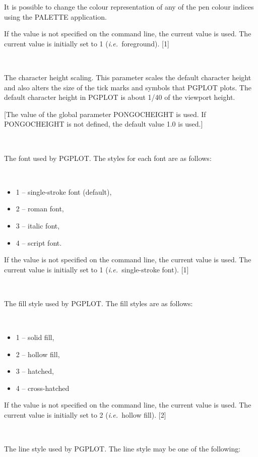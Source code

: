 \documentclass[twoside,11pt]{article}
\renewcommand{\_}{\texttt{\symbol{95}}}
\newcommand{\ie}{{\em i.e.\ }}
\newcommand{\sstsubsection}[1]{ \item[{#1}] \mbox{} \\}
\newcommand{\sstitemlist}[1]{
  \mbox{} \\
  \vspace{-3.5ex}
  \begin{itemize}
     #1
  \end{itemize}
}
\newcommand{\sstitem}{\item}
\newcommand{\sstsubsection}[1]{\item[{#1}]}
\newcommand{\sstitemlist}[1]{
      \begin{itemize}
         #1
      \end{itemize}
      \\
   }
\newcommand{\sstitem}{\item}
\begin{document}
{{{{         }
         It is possible to change the colour representation of any of
         the pen colour indices using the PALETTE application.

         If the value is not specified on the command line, the current
         value is used. The current value is initially set to 1
         (\ie foreground).
         [1]
      }
      \sstsubsection{
         CHEIGHT = \_REAL (Read and Write)
      }{
         The character height scaling. This parameter scales the
         default character height and also alters the size of the tick
         marks and symbols that PGPLOT plots. The default character
         height in PGPLOT is about 1/40 of the viewport height.

         [The value of the global parameter PONGO\_CHEIGHT is used. If
         PONGO\_CHEIGHT is not defined, the default value 1.0 is used.]
      }
      \sstsubsection{
         FONT = \_INTEGER (Read)
      }{
         The font used by PGPLOT. The styles for each font are as
         follows:

         \sstitemlist{

            \sstitem
               1 -- single-stroke font (default),

            \sstitem
               2 -- roman font,

            \sstitem
               3 -- italic font,

            \sstitem
               4 -- script font.

         }
         If the value is not specified on the command line, the current
         value is used. The current value is initially set to 1
         (\ie single-stroke font).
         [1]
      }
      \sstsubsection{
         FILLSTY = \_INTEGER (Read)
      }{
         The fill style used by PGPLOT. The fill styles are as follows:

         \sstitemlist{

            \sstitem
               1 -- solid fill,

            \sstitem
               2 -- hollow fill,

            \sstitem
               3 -- hatched,

            \sstitem
               4 -- cross-hatched

         }
         If the value is not specified on the command line, the current
         value is used. The current value is initially set to 2
         (\ie hollow fill).
         [2]
      }
      \sstsubsection{
         LINESTY = \_INTEGER (Read)
      }{
         The line style used by PGPLOT.  The line style may be one of
         the following:

}}}
\end{document}
